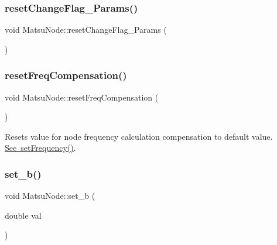 \mbox{\label{classMatsuNode_a155f3533b85aacccd528ce7b04e24289}} 
\subsubsection{\texorpdfstring{reset\+Change\+Flag\+\_\+\+Params()}{resetChangeFlag\_Params()}}
{\footnotesize\ttfamily void Matsu\+Node\+::reset\+Change\+Flag\+\_\+\+Params (\begin{DoxyParamCaption}{ }\end{DoxyParamCaption})}

\mbox{\label{classMatsuNode_a131b380ea1f15f19ecc8c3fb4931f6dd}} 
\subsubsection{\texorpdfstring{reset\+Freq\+Compensation()}{resetFreqCompensation()}}
{\footnotesize\ttfamily void Matsu\+Node\+::reset\+Freq\+Compensation (\begin{DoxyParamCaption}{ }\end{DoxyParamCaption})}



Resets value for node frequency calculation compensation to default value. \mbox{\hyperlink{classMatsuNode_adb33b1e7dcfaf786be5d99627bca1c14}{See set\+Frequency()}}. 

\mbox{\label{classMatsuNode_a6d67de2da757be9edc89247e8c25b892}} 
\subsubsection{\texorpdfstring{set\+\_\+b()}{set\_b()}}
{\footnotesize\ttfamily void Matsu\+Node\+::set\+\_\+b (\begin{DoxyParamCaption}\item[{double}]{val }\end{DoxyParamCaption})}


